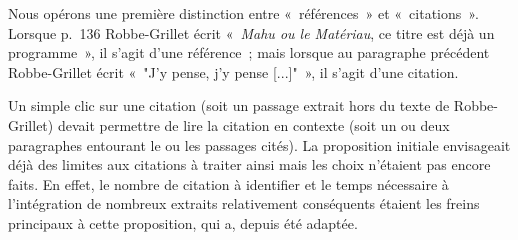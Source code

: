 Nous opérons une première distinction entre «~références~» et «~citations~». Lorsque p.~136 Robbe-Grillet écrit «~\textit{Mahu ou le Matériau}, ce titre est déjà un programme~», il s'agit d'une référence~; mais lorsque au paragraphe précédent Robbe-Grillet écrit «~"J'y pense, j'y pense [...]"~», il s'agit d'une citation.

Un simple clic sur une citation (soit un passage extrait hors du texte de Robbe-Grillet) devait permettre de lire la citation en contexte (soit un ou deux paragraphes entourant le ou les passages cités). La proposition initiale envisageait déjà des limites aux citations à traiter ainsi mais les choix n'étaient pas encore faits. En effet, le nombre de citation à identifier et le temps nécessaire à l'intégration de nombreux extraits relativement conséquents étaient les freins principaux à cette proposition, qui a, depuis été adaptée.


